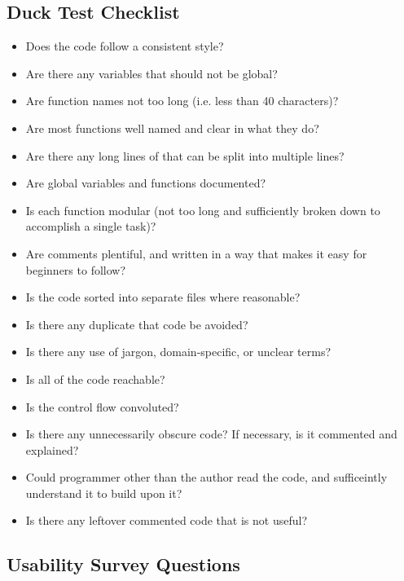 \documentclass[12pt, titlepage]{article}
\begin{document}
\subsection{Duck Test Checklist} \label{checklist_duckTest}

\begin{itemize}
  \item{Does the code follow a consistent style?}
  \item{Are there any variables that should not be global?}
  \item{Are function names not too long (i.e. less than 40 characters)?}
  \item{Are most functions well named and clear in what they do?}
  \item{Are there any long lines of that can be split into multiple lines?}
  \item{Are global variables and functions documented?}
  \item{Is each function modular (not too long and sufficiently broken down to accomplish a single task)?}
  \item{Are comments plentiful, and written in a way that makes it easy for beginners to follow?}
  \item{Is the code sorted into separate files where reasonable?}
  \item{Is there any duplicate that code be avoided?}
  \item{Is there any use of jargon, domain-specific, or unclear terms?}
  \item{Is all of the code reachable?}
  \item{Is the control flow convoluted?}
  \item{Is there any unnecessarily obscure code? If necessary, is it commented and explained?}
  \item{Could programmer other than the author read the code, and sufficeintly understand it to build upon it?}
  \item{Is there any leftover commented code that is not useful?}
\end{itemize}

\subsection{Usability Survey Questions} \label{survey_useability}
\end{document}

